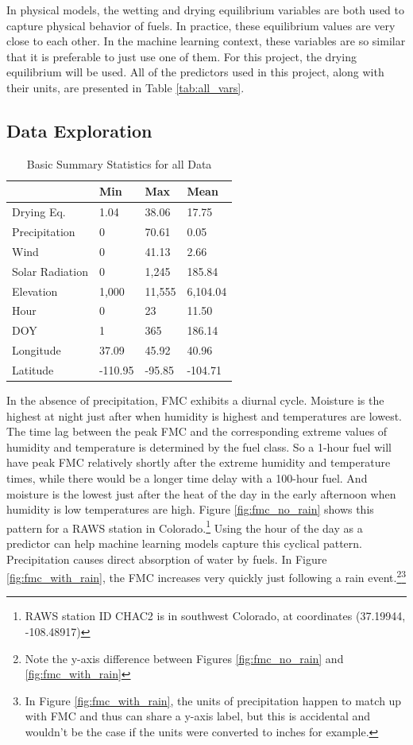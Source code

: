 \documentclass[11pt]{article}%
\begin{document}
In physical models, the wetting and drying equilibrium variables are both used to capture physical behavior of fuels. In practice, these equilibrium values are very close to each other. In the machine learning context, these variables are so similar that it is preferable to just use one of them. For this project, the drying equilibrium will be used. All of the predictors used in this project, along with their units, are presented in Table \ref{tab:all_vars}.

\subsection{Data Exploration}

\begin{table}[ht]
\centering
\caption{Basic Summary Statistics for all Data}
\label{tab:all_dat_summary}
\begin{tabular}{llll}
\toprule
 & Min & Max & Mean \\
\midrule
Drying Eq. & 1.04 & 38.06 & 17.75 \\
Precipitation & 0 & 70.61 & 0.05 \\
Wind & 0 & 41.13 & 2.66 \\
Solar Radiation & 0 & 1,245 & 185.84 \\
Elevation & 1,000 & 11,555 & 6,104.04 \\
Hour & 0 & 23 & 11.50 \\
DOY & 1 & 365 & 186.14 \\
Longitude & 37.09 & 45.92 & 40.96 \\
Latitude & -110.95 & -95.85 & -104.71 \\
\bottomrule
\end{tabular}
\end{table}

In the absence of precipitation, FMC exhibits a diurnal cycle. Moisture is the highest at night just after when humidity is highest and temperatures are lowest. The time lag between the peak FMC and the corresponding extreme values of humidity and temperature is determined by the fuel class. So a 1-hour fuel will have peak FMC relatively shortly after the extreme humidity and temperature times, while there would be a longer time delay with a 100-hour fuel. And moisture is the lowest just after the heat of the day in the early afternoon when humidity is low temperatures are high. Figure \ref{fig:fmc_no_rain} shows this pattern for a RAWS station in Colorado.\footnote{RAWS station ID CHAC2 is in southwest Colorado, at coordinates (37.19944,	-108.48917)} Using the hour of the day as a predictor can help machine learning models capture this cyclical pattern. Precipitation causes direct absorption of water by fuels. In Figure \ref{fig:fmc_with_rain}, the FMC increases very quickly just following a rain event.\footnote{Note the y-axis difference between Figures \ref{fig:fmc_no_rain} and \ref{fig:fmc_with_rain}}\footnote{In Figure \ref{fig:fmc_with_rain}, the units of precipitation happen to match up with FMC and thus can share a y-axis label, but this is accidental and wouldn't be the case if the units were converted to inches for example.}
\end{document}
